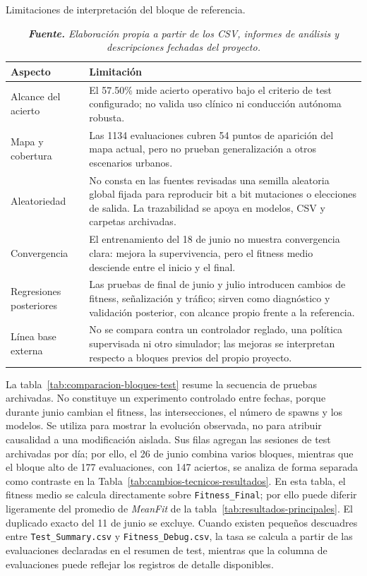 \begin{table}[H]
\centering
\caption{Limitaciones de interpretación del bloque de referencia.}%
\label{tab:limitaciones-experimentales}
\begin{tabularx}{0.96\textwidth}{L{3.25cm}X}
\toprule
\textbf{Aspecto} & \textbf{Limitación}\\
\midrule
Alcance del acierto & El 57.50\% mide acierto operativo bajo el criterio de test configurado; no valida uso clínico ni conducción autónoma robusta.\\
Mapa y cobertura & Las 1134 evaluaciones cubren 54 puntos de aparición del mapa actual, pero no prueban generalización a otros escenarios urbanos.\\
Aleatoriedad & No consta en las fuentes revisadas una semilla aleatoria global fijada para reproducir bit a bit mutaciones o elecciones de salida. La trazabilidad se apoya en modelos, CSV y carpetas archivadas.\\
Convergencia & El entrenamiento del 18 de junio no muestra convergencia clara: mejora la supervivencia, pero el fitness medio desciende entre el inicio y el final.\\
Regresiones posteriores & Las pruebas de final de junio y julio introducen cambios de fitness, señalización y tráfico; sirven como diagnóstico y validación posterior, con alcance propio frente a la referencia.\\
Línea base externa & No se compara contra un controlador reglado, una política supervisada ni otro simulador; las mejoras se interpretan respecto a bloques previos del propio proyecto.\\
\bottomrule
\end{tabularx}
\caption*{\textit{\textbf{Fuente.} Elaboración propia a partir de los CSV, informes de análisis y descripciones fechadas del proyecto.}}
\end{table}

La tabla~\ref{tab:comparacion-bloques-test} resume la secuencia de pruebas archivadas. No constituye un experimento controlado entre fechas, porque durante junio cambian el fitness, las intersecciones, el número de spawns y los modelos. Se utiliza para mostrar la evolución observada, no para atribuir causalidad a una modificación aislada. Sus filas agregan las sesiones de test archivadas por día; por ello, el 26 de junio combina varios bloques, mientras que el bloque alto de 177 evaluaciones, con 147 aciertos, se analiza de forma separada como contraste en la Tabla~\ref{tab:cambios-tecnicos-resultados}. En esta tabla, el fitness medio se calcula directamente sobre \texttt{Fitness\_Final}; por ello puede diferir ligeramente del promedio de \textit{MeanFit} de la tabla~\ref{tab:resultados-principales}. El duplicado exacto del 11 de junio se excluye. Cuando existen pequeños descuadres entre \texttt{Test\_Summary.csv} y \texttt{Fitness\_Debug.csv}, la tasa se calcula a partir de las evaluaciones declaradas en el resumen de test, mientras que la columna de evaluaciones puede reflejar los registros de detalle disponibles.

